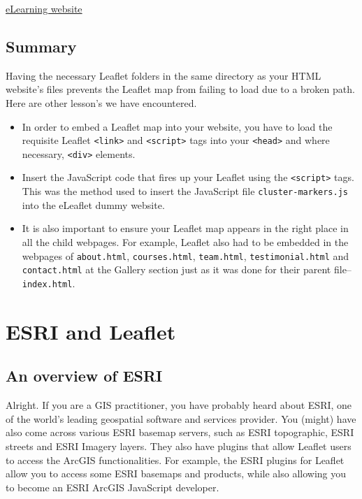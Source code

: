 \documentclass[
]{book}
\begin{document}
\href{https://sammigachuhi.github.io/elearning_template_demo/}{eLearning website}

\hypertarget{summary-11}{%
\section{Summary}\label{summary-11}}

Having the necessary Leaflet folders in the same directory as your HTML website's files prevents the Leaflet map from failing to load due to a broken path. Here are other lesson's we have encountered.

\begin{itemize}
\item
  In order to embed a Leaflet map into your website, you have to load the requisite Leaflet \texttt{\textless{}link\textgreater{}} and \texttt{\textless{}script\textgreater{}} tags into your \texttt{\textless{}head\textgreater{}} and where necessary, \texttt{\textless{}div\textgreater{}} elements.
\item
  Insert the JavaScript code that fires up your Leaflet using the \texttt{\textless{}script\textgreater{}} tags. This was the method used to insert the JavaScript file \texttt{cluster-markers.js} into the eLeaflet dummy website.
\item
  It is also important to ensure your Leaflet map appears in the right place in all the child webpages. For example, Leaflet also had to be embedded in the webpages of \texttt{about.html}, \texttt{courses.html}, \texttt{team.html}, \texttt{testimonial.html} and \texttt{contact.html} at the Gallery section just as it was done for their parent file-- \texttt{index.html}.
\end{itemize}

\hypertarget{esri-and-leaflet}{%
\chapter{ESRI and Leaflet}\label{esri-and-leaflet}}

\hypertarget{an-overview-of-esri}{%
\section{An overview of ESRI}\label{an-overview-of-esri}}

Alright. If you are a GIS practitioner, you have probably heard about ESRI, one of the world's leading geospatial software and services provider. You (might) have also come across various ESRI basemap servers, such as ESRI topographic, ESRI streets and ESRI Imagery layers. They also have plugins that allow Leaflet users to access the ArcGIS functionalities. For example, the ESRI plugins for Leaflet allow you to access some ESRI basemaps and products, while also allowing you to become an ESRI ArcGIS JavaScript developer.
\end{document}
